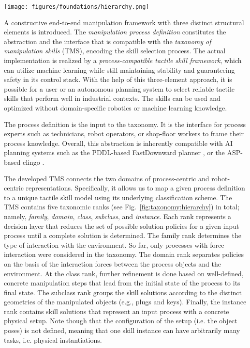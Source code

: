 \begin{figure*}[ht!]
    \centering
    \texttt{[image: figures/foundations/hierarchy.png]}
    \caption{Ranks of the taxonomy of manipulation skills}
    \label{fig:taxonomy:hierarchy}
\end{figure*}

A constructive end-to-end manipulation framework with three distinct structural elements is introduced.
The \emph{manipulation process definition} constitutes the abstraction and the interface that is compatible with the \emph{taxonomy of manipulation skills} (TMS), encoding the skill selection process.
The actual implementation is realized by a \emph{process-compatible tactile skill framework}, which can utilize machine learning while still maintaining stability and guaranteeing safety in its control stack.
With the help of this three-element approach, it is possible for a user or an autonomous planning system to select reliable tactile skills that perform well in industrial contexts.
The skills can be used and optimized without domain-specific robotics or machine learning knowledge.

The process definition is the input to the taxonomy.
It is the interface for process experts such as technicians, robot operators, or shop-floor workers to frame their process knowledge.
Overall, this abstraction is inherently compatible with AI planning systems such as the PDDL-based FastDownward planner \cite{helmert2006fast}, or the ASP-based clingo \cite{gebser2014clingo}.

The developed TMS connects the two domains of process-centric and robot-centric representations.
Specifically, it allows us to map a given process definition to a unique tactile skill model using its underlying classification scheme.
The TMS contains five taxonomic ranks (see Fig.~\ref{fig:taxonomy:hierarchy}) in total; namely, \emph{family}, \emph{domain}, \emph{class}, \emph{subclass}, and \emph{instance}.
Each rank represents a decision layer that reduces the set of possible solution policies for a given input process until a complete solution is determined.
The family rank determines the type of interaction with the environment.
So far, only processes with force interaction were considered in the taxonomy.
The domain rank separates policies on the basis of the interaction forces between the process objects and the environment.
At the class rank, further refinement is done based on well-defined, concrete manipulation steps that lead from the initial state of the process to its final state.
The subclass rank groups the skill solutions according to the distinct geometries of the manipulated objects (e.g., plugs and keys).
Finally, the instance rank contains skill solutions that represent an input process with a concrete physical setup.
Note though that the configuration of the setup (i.e. the object poses) is not defined, meaning that one skill instance can have arbitrarily many tasks, i.e. physical instantiations.

